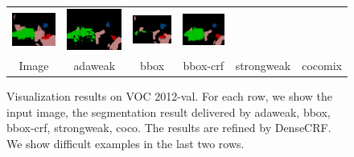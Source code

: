 \begin{figure}[!htbp]
{\begin{tabular}{c c c c c c}
    \includegraphics[height=0.11\linewidth]{fig/val_crf_vis/bbox/2007_001175.png} &
    \includegraphics[height=0.11\linewidth]{fig/val_crf_vis/bbox_crf/2007_001175.png} &
    \includegraphics[height=0.11\linewidth]{fig/val_crf_vis/strongweak/2007_001175.png} &
    \includegraphics[height=0.11\linewidth]{fig/val_crf_vis/cocomix/2007_001175.png} \\
    Image & adaweak & bbox & bbox-crf & strongweak & cocomix \\
  \end{tabular}
  }
  \caption{Visualization results on VOC 2012-val. For each row, we show the input image, the segmentation result delivered by adaweak, bbox, bbox-crf, strongweak, coco. The results are refined by DenseCRF. We show difficult examples in the last two rows.} 
  \label{fig:ValResults}
\end{figure}





